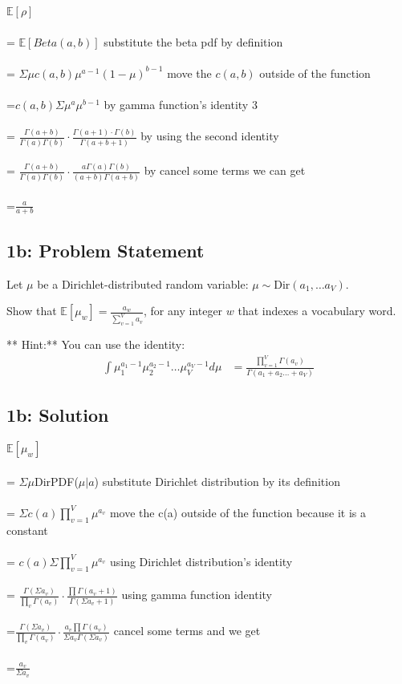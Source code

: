 \documentclass[10pt]{article}
\newcommand{\officialdirections}[1]{{\color{purple} #1}}
\begin{document}
$\mathbb{E}[ \rho ]$
\\
\\
= $\mathbb{E}[ Beta(a,b) ]$ substitute the beta pdf by definition
\\
\\
= $\Sigma \mu c(a,b)\mu^{a-1}(1-\mu)^{b-1}$ move the $c(a,b)$ outside of the function
\\
\\
=$c(a,b)\Sigma \mu^{a}\mu^{b-1}$ by gamma function's identity 3
\\
\\
= $\frac{\Gamma(a+b)}{\Gamma(a)\Gamma(b)}\cdot\frac{\Gamma(a+1)\cdot\Gamma(b)}{\Gamma(a+b+1)}$ by using the second identity
\\
\\
= $\frac{\Gamma(a+b)}{\Gamma(a)\Gamma(b)}\cdot\frac{a\Gamma(a)\Gamma(b)}{(a+b)\Gamma(a+b)}$ by cancel some terms we can get
\\
\\
=$\frac{a}{a+b}$


\officialdirections{
\subsection*{1b: Problem Statement}

Let $\mu$ be a Dirichlet-distributed random variable: $\mu \sim \text{Dir}(a_1, \ldots a_V)$. 

Show that $\mathbb{E}[ \mu_w ] = \frac{a_w}{\sum_{v=1}^V a_v}$, for any integer $w$ that indexes a vocabulary word.

** Hint:** You can use the identity:
\begin{align}
\int \mu_1^{a_1-1} \mu_2^{a_2 - 1} \ldots \mu_V^{a_V-1} d\mu
 &= \frac
 	{\prod_{v=1}^V \Gamma(a_v)}
 	{\Gamma(a_1 + a_2 \ldots + a_V)}
\end{align}
}

\subsection{1b: Solution}
$\mathbb{E}[ \mu_w ]$
\\
\\
= $\Sigma \mu$DirPDF($\mu|a$) substitute Dirichlet distribution by its definition
\\
\\
= $\Sigma c(a)\prod_{v=1}^V\mu^{a_v}$ move the c(a) outside of the function because it is a constant
\\
\\
= $c(a) \Sigma\prod_{v=1}^V\mu^{a_v}$ using Dirichlet distribution's identity
\\
\\
= $\frac{\Gamma(\Sigma a_v)}{\prod_{v}\Gamma(a_v)}\cdot\frac{\prod\Gamma(a_v+1)}{\Gamma(\Sigma a_v+1)}$ using gamma function identity
\\
\\
=$\frac{\Gamma(\Sigma a_v)}{\prod_{v}\Gamma(a_v)}\cdot\frac{a_v\prod\Gamma(a_v)}{\Sigma a_v\Gamma(\Sigma a_v)}$ cancel some terms and we get 
\\
\\
=$\frac{a_v}{\Sigma a_v}$
\end{document}
